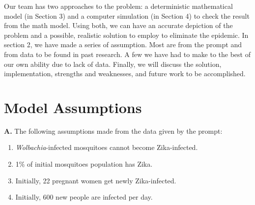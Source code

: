 \documentclass{article}
\begin{document}
Our team has two approaches to the problem: a deterministic mathematical model (in Section 3) and a computer simulation (in Section 4) to check the result from the math model. Using both, we can have an accurate depiction of the problem and a possible, realistic solution to employ to eliminate the epidemic. In section 2, we have made a series of assumption. Most are from the prompt and from data to be found in past research. A few we have had to make to the best of our own ability due to lack of data. Finally, we will discuss the solution, implementation, strengths and weaknesses, and future work to be accomplished. 

\section{Model Assumptions}
\textbf{A.} The following assumptions made from the data given by the prompt: 
\begin{enumerate}
    \item \textit{Wolbachia}-infected mosquitoes cannot become Zika-infected.
    \item 1\% of initial mosquitoes population has Zika. 
    \item Initially, 22 pregnant women get newly Zika-infected. 
    \item Initially, 600 new people are infected per day.
\end{enumerate}
\end{document}
